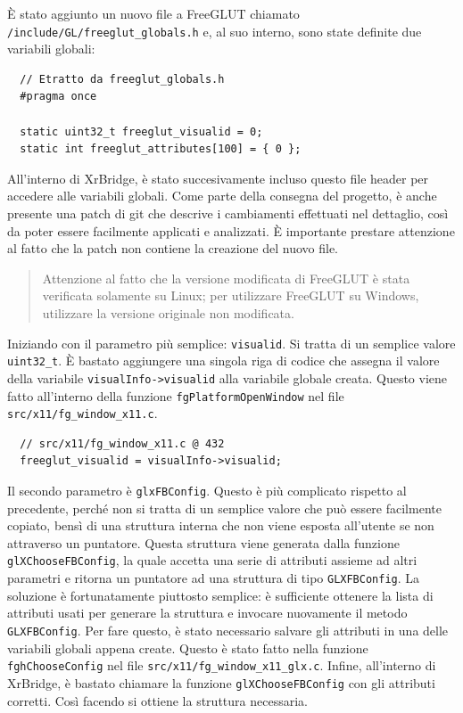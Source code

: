 \documentclass[twoside]{supsistudent}
\begin{document}
È stato aggiunto un nuovo file a FreeGLUT chiamato \texttt{/include/GL/freeglut\_globals.h} e, al suo interno, sono state definite due variabili globali:

\begin{verbatim}
  // Etratto da freeglut_globals.h
  #pragma once

  static uint32_t freeglut_visualid = 0;
  static int freeglut_attributes[100] = { 0 };
\end{verbatim}

All'interno di XrBridge, è stato succesivamente incluso questo file header per accedere alle variabili globali. Come parte della consegna del progetto, è anche presente una patch di git che descrive i cambiamenti effettuati nel dettaglio, così da poter essere facilmente applicati e analizzati. È importante prestare attenzione al fatto che la patch non contiene la creazione del nuovo file.

\begin{quote}
  Attenzione al fatto che la versione modificata di FreeGLUT è stata verificata solamente su Linux; per utilizzare FreeGLUT su Windows, utilizzare la versione originale non modificata.
\end{quote}

Iniziando con il parametro più semplice: \texttt{visualid}. Si tratta di un semplice valore \texttt{uint32\_t}. È bastato aggiungere una singola riga di codice che assegna il valore della variabile \texttt{visualInfo->visualid} alla variabile globale creata. Questo viene fatto all'interno della funzione \texttt{fgPlatformOpenWindow} nel file \texttt{src/x11/fg\_window\_x11.c}.

\begin{verbatim}
  // src/x11/fg_window_x11.c @ 432
  freeglut_visualid = visualInfo->visualid;
\end{verbatim}

Il secondo parametro è \texttt{glxFBConfig}. Questo è più complicato rispetto al precedente, perché non si tratta di un semplice valore che può essere facilmente copiato, bensì di una struttura interna che non viene esposta all'utente se non attraverso un puntatore. Questa struttura viene generata dalla funzione \texttt{glXChooseFBConfig}, la quale accetta una serie di attributi assieme ad altri parametri e ritorna un puntatore ad una struttura di tipo \texttt{GLXFBConfig}. La soluzione è fortunatamente piuttosto semplice: è sufficiente ottenere la lista di attributi usati per generare la struttura e invocare nuovamente il metodo \texttt{GLXFBConfig}. Per fare questo, è stato necessario salvare gli attributi in una delle variabili globali appena create. Questo è stato fatto nella funzione \texttt{fghChooseConfig} nel file \texttt{src/x11/fg\_window\_x11\_glx.c}. Infine, all'interno di XrBridge, è bastato chiamare la funzione \texttt{glXChooseFBConfig} con gli attributi corretti. Così facendo si ottiene la struttura necessaria.
\end{document}
